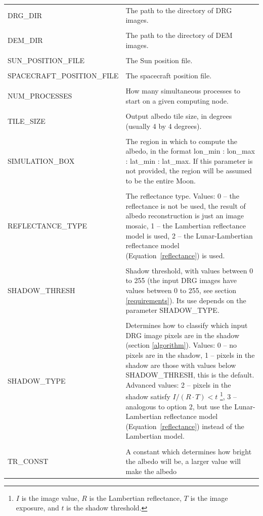 \documentclass[letterpaper,fleqn,11pt]{report}
\begin{document}
\begin{longtable}{ l p{7cm} }
DRG\_DIR & The path to the directory of DRG images. \\
\\
DEM\_DIR & The path to the directory of DEM images. \\
\\
SUN\_POSITION\_FILE  & The Sun position file.  \\
\\
SPACECRAFT\_POSITION\_FILE & The spacecraft position file.  \\
\\
NUM\_PROCESSES & How many simultaneous processes to start on a given
computing node. \\
\\
TILE\_SIZE & Output albedo tile size, in degrees (usually 4 by 4 degrees). \\
\\
SIMULATION\_BOX &         The region in which to compute the albedo, in
the format lon\_min : lon\_max : lat\_min : lat\_max. If this
parameter is not provided, the region will be assumed to be the entire Moon. \\
\\
REFLECTANCE\_TYPE &
The reflectance type. Values: 0 -- the reflectance is not
be used, the result of albedo reconstruction is just an image mosaic, 1 --
the Lambertian reflectance model is used, 2 -- the Lunar-Lambertian
reflectance model (Equation~\ref{reflectance}) is used.\\
\\
SHADOW\_THRESH    &         
 Shadow threshold, with values between 0 to 255 (the input DRG images
 have values between 0 to 255, see section \ref{requirements}). Its
 use depends on the parameter SHADOW\_TYPE.
\\
\\
SHADOW\_TYPE & Determines how to classify which input DRG image pixels are in
the shadow (section \ref{algorithm}). Values: 0 -- no pixels are in
the shadow, 1 -- pixels in the shadow are those with values below
SHADOW\_THRESH, this is the default. Advanced values: 2 -- pixels in the
shadow satisfy $I/(R\cdot T) < t$ \footnote{$I$ is the
image value, $R$ is the Lambertian reflectance, $T$ is the image
exposure, and $t$ is the shadow threshold.}, 3 -- 
analogous to option 2, but use the Lunar-Lambertian reflectance model (Equation~\ref{reflectance})
instead of the Lambertian model.\\
\\
TR\_CONST & A constant which determines how bright the albedo will be, a larger value will make the albedo 

\end{longtable}
\end{document}
